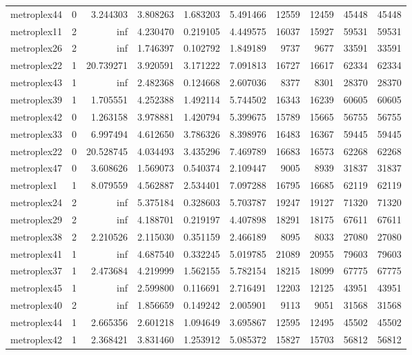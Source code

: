 \begin{longtable}{|l|r|r|r|r|r|r|r|r|r|}
metroplex44 & 0 & 3.244303 & 3.808263 & 1.683203 & 5.491466 & 12559 & 12459 & 45448 & 45448 \\
metroplex11 & 2 & inf & 4.230470 & 0.219105 & 4.449575 & 16037 & 15927 & 59531 & 59531 \\
metroplex26 & 2 & inf & 1.746397 & 0.102792 & 1.849189 & 9737 & 9677 & 33591 & 33591 \\
metroplex22 & 1 & 20.739271 & 3.920591 & 3.171222 & 7.091813 & 16727 & 16617 & 62334 & 62334 \\
metroplex43 & 1 & inf & 2.482368 & 0.124668 & 2.607036 & 8377 & 8301 & 28370 & 28370 \\
metroplex39 & 1 & 1.705551 & 4.252388 & 1.492114 & 5.744502 & 16343 & 16239 & 60605 & 60605 \\
metroplex42 & 0 & 1.263158 & 3.978881 & 1.420794 & 5.399675 & 15789 & 15665 & 56755 & 56755 \\
metroplex33 & 0 & 6.997494 & 4.612650 & 3.786326 & 8.398976 & 16483 & 16367 & 59445 & 59445 \\
metroplex22 & 0 & 20.528745 & 4.034493 & 3.435296 & 7.469789 & 16683 & 16573 & 62268 & 62268 \\
metroplex47 & 0 & 3.608626 & 1.569073 & 0.540374 & 2.109447 & 9005 & 8939 & 31837 & 31837 \\
metroplex1 & 1 & 8.079559 & 4.562887 & 2.534401 & 7.097288 & 16795 & 16685 & 62119 & 62119 \\
metroplex24 & 2 & inf & 5.375184 & 0.328603 & 5.703787 & 19247 & 19127 & 71320 & 71320 \\
metroplex29 & 2 & inf & 4.188701 & 0.219197 & 4.407898 & 18291 & 18175 & 67611 & 67611 \\
metroplex38 & 2 & 2.210526 & 2.115030 & 0.351159 & 2.466189 & 8095 & 8033 & 27080 & 27080 \\
metroplex41 & 1 & inf & 4.687540 & 0.332245 & 5.019785 & 21089 & 20955 & 79603 & 79603 \\
metroplex37 & 1 & 2.473684 & 4.219999 & 1.562155 & 5.782154 & 18215 & 18099 & 67775 & 67775 \\
metroplex45 & 1 & inf & 2.599800 & 0.116691 & 2.716491 & 12203 & 12125 & 43951 & 43951 \\
metroplex40 & 2 & inf & 1.856659 & 0.149242 & 2.005901 & 9113 & 9051 & 31568 & 31568 \\
metroplex44 & 1 & 2.665356 & 2.601218 & 1.094649 & 3.695867 & 12595 & 12495 & 45502 & 45502 \\
metroplex42 & 1 & 2.368421 & 3.831460 & 1.253912 & 5.085372 & 15827 & 15703 & 56812 & 56812 \\

\end{longtable}
